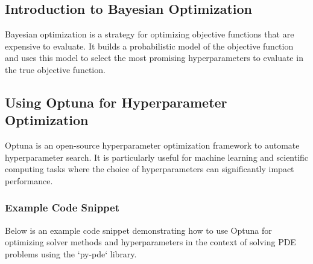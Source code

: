 \documentclass{article}
\begin{document}
\subsection{Introduction to Bayesian Optimization}
Bayesian optimization is a strategy for optimizing objective functions that are expensive to evaluate. It builds a probabilistic model of the objective function and uses this model to select the most promising hyperparameters to evaluate in the true objective function.

\subsection{Using Optuna for Hyperparameter Optimization}
Optuna is an open-source hyperparameter optimization framework to automate hyperparameter search. It is particularly useful for machine learning and scientific computing tasks where the choice of hyperparameters can significantly impact performance.

\subsubsection{Example Code Snippet}
Below is an example code snippet demonstrating how to use Optuna for optimizing solver methods and hyperparameters in the context of solving PDE problems using the `py-pde` library.
\end{document}
